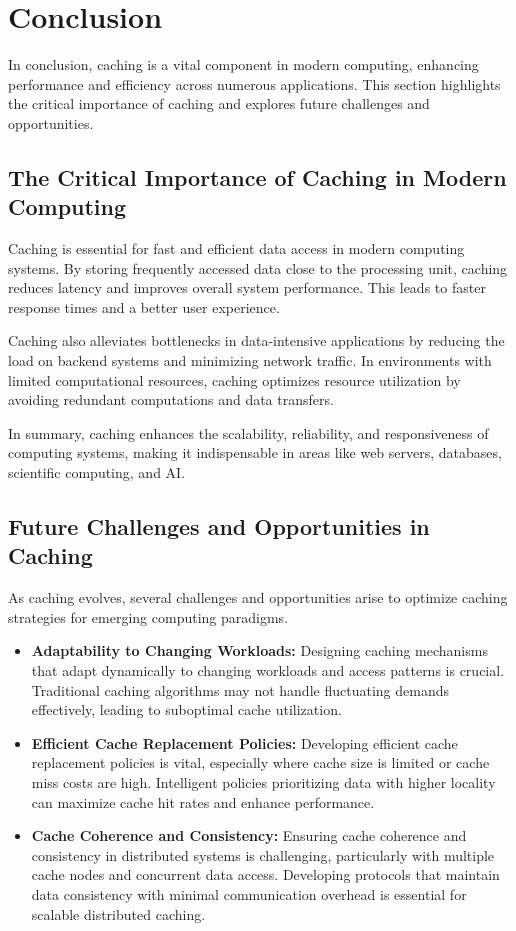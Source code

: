 \documentclass[12pt]{book} %
\begin{document}
\section{Conclusion}

In conclusion, caching is a vital component in modern computing, enhancing performance and efficiency across numerous applications. This section highlights the critical importance of caching and explores future challenges and opportunities.

\subsection{The Critical Importance of Caching in Modern Computing}

Caching is essential for fast and efficient data access in modern computing systems. By storing frequently accessed data close to the processing unit, caching reduces latency and improves overall system performance. This leads to faster response times and a better user experience.

Caching also alleviates bottlenecks in data-intensive applications by reducing the load on backend systems and minimizing network traffic. In environments with limited computational resources, caching optimizes resource utilization by avoiding redundant computations and data transfers.

In summary, caching enhances the scalability, reliability, and responsiveness of computing systems, making it indispensable in areas like web servers, databases, scientific computing, and AI.

\subsection{Future Challenges and Opportunities in Caching}

As caching evolves, several challenges and opportunities arise to optimize caching strategies for emerging computing paradigms.

\begin{itemize}
    \item \textbf{Adaptability to Changing Workloads:} Designing caching mechanisms that adapt dynamically to changing workloads and access patterns is crucial. Traditional caching algorithms may not handle fluctuating demands effectively, leading to suboptimal cache utilization.
    
    \item \textbf{Efficient Cache Replacement Policies:} Developing efficient cache replacement policies is vital, especially where cache size is limited or cache miss costs are high. Intelligent policies prioritizing data with higher locality can maximize cache hit rates and enhance performance.
    
    \item \textbf{Cache Coherence and Consistency:} Ensuring cache coherence and consistency in distributed systems is challenging, particularly with multiple cache nodes and concurrent data access. Developing protocols that maintain data consistency with minimal communication overhead is essential for scalable distributed caching.
\end{itemize}
\end{document}

